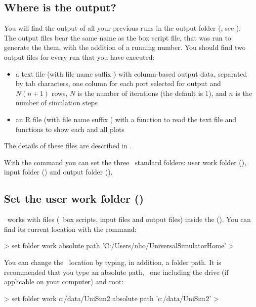 \subsection{Where is the output?}
\label{ch:where-is-the-output}
You will find the output of all your previous runs in the output folder (\outputfolder, see ). The output files bear the same name as the box script file, that was run to generate the them, with the addition of a running number. You should find two output files for every run that you have executed:
\begin{itemize}
\item a text file (with file name suffix ) with column-based output data, separated by tab characters, one column for each port selected for output and $N(n+1)$ rows, $N$ is the number of iterations (the default is 1), and $n$ is the number of simulation steps
\item an R file (with file name suffix ) with a function to read the text file and functions to show each and all plots
\end{itemize}
The details of these files are described in .



With the  command you can set the three \US\ standard folders: user work folder (\ushome), input folder () and output folder (\outputfolder).

\subsection{Set the user work folder (\ushome)}
\US\ works with files (\eg\ box scripts, input files and output files) inside the  (\ushome). You can find its current location with the  command:

\begin{usdialog}
> set folder work
absolute path 'C:/Users/nho/UniversalSimulatorHome'
> 
\end{usdialog}

You can change the \ushome\ location by typing, in addition, a folder path. It is recommended that you type an absolute path, \ie\ one including the drive (if applicable on your computer) and root:

\begin{usdialog}
> set folder work c:/data/UniSim2
absolute path 'c:/data/UniSim2'
> 
\end{usdialog}

